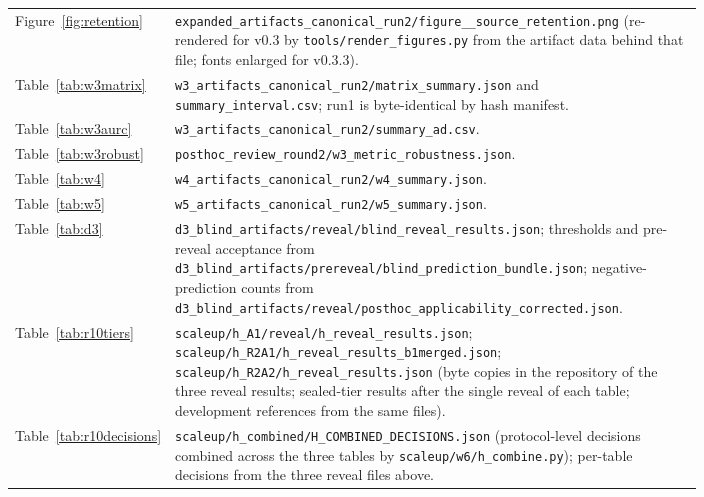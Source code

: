 \documentclass[11pt,a4paper]{article}
\begin{document}
{\begin{longtable}{lp{0.80\linewidth}}
Figure~\ref{fig:retention} & \texttt{expanded\_\allowbreak artifacts\_\allowbreak canonical\_\allowbreak run2/\allowbreak figure\_\allowbreak 4\_\allowbreak source\_\allowbreak retention.png} (re-rendered for v0.3 by \texttt{tools/\allowbreak render\_\allowbreak figures.py} from the artifact data behind that file; fonts enlarged for v0.3.3). \\
Table~\ref{tab:w3matrix} & \texttt{w3\_\allowbreak artifacts\_\allowbreak canonical\_\allowbreak run2/\allowbreak matrix\_\allowbreak summary.json} and \texttt{summary\_\allowbreak interval.csv}; run1 is byte-identical by hash manifest. \\
Table~\ref{tab:w3aurc} & \texttt{w3\_\allowbreak artifacts\_\allowbreak canonical\_\allowbreak run2/\allowbreak summary\_\allowbreak ad.csv}. \\
Table~\ref{tab:w3robust} & \texttt{posthoc\_\allowbreak review\_\allowbreak round2/\allowbreak w3\_\allowbreak metric\_\allowbreak robustness.json}. \\
Table~\ref{tab:w4} & \texttt{w4\_\allowbreak artifacts\_\allowbreak canonical\_\allowbreak run2/\allowbreak w4\_\allowbreak summary.json}. \\
Table~\ref{tab:w5} & \texttt{w5\_\allowbreak artifacts\_\allowbreak canonical\_\allowbreak run2/\allowbreak w5\_\allowbreak summary.json}. \\
Table~\ref{tab:d3} & \texttt{d3\_\allowbreak blind\_\allowbreak artifacts/\allowbreak reveal/\allowbreak blind\_\allowbreak reveal\_\allowbreak results.json}; thresholds and pre-reveal acceptance from \texttt{d3\_\allowbreak blind\_\allowbreak artifacts/\allowbreak prereveal/\allowbreak blind\_\allowbreak prediction\_\allowbreak bundle.json}; negative-prediction counts from \texttt{d3\_\allowbreak blind\_\allowbreak artifacts/\allowbreak reveal/\allowbreak posthoc\_\allowbreak applicability\_\allowbreak corrected.json}. \\
Table~\ref{tab:r10tiers} & \texttt{scaleup/\allowbreak h\_A1/\allowbreak reveal/\allowbreak h\_\allowbreak reveal\_\allowbreak results.json}; \texttt{scaleup/\allowbreak h\_R2A1/\allowbreak h\_\allowbreak reveal\_\allowbreak results\_\allowbreak b1merged.json}; \texttt{scaleup/\allowbreak h\_R2A2/\allowbreak h\_\allowbreak reveal\_\allowbreak results.json} (byte copies in the repository of the three reveal results; sealed-tier results after the single reveal of each table; development references from the same files). \\
Table~\ref{tab:r10decisions} & \texttt{scaleup/\allowbreak h\_combined/\allowbreak H\_\allowbreak COMBINED\_\allowbreak DECISIONS.json} (protocol-level decisions combined across the three tables by \texttt{scaleup/\allowbreak w6/\allowbreak h\_\allowbreak combine.py}); per-table decisions from the three reveal files above. \\

\end{longtable}}
\end{document}
